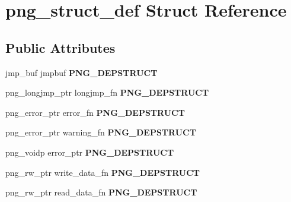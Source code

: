 \hypertarget{structpng__struct__def}{}\section{png\+\_\+struct\+\_\+def Struct Reference}
\label{structpng__struct__def}
\subsection*{Public Attributes}
\begin{DoxyCompactItemize}
\item 
jmp\+\_\+buf jmpbuf {\bfseries P\+N\+G\+\_\+\+D\+E\+P\+S\+T\+R\+U\+CT}\hypertarget{structpng__struct__def_a68dc486a51546dcb141d660fc46d1591}{}\label{structpng__struct__def_a68dc486a51546dcb141d660fc46d1591}

\item 
png\+\_\+longjmp\+\_\+ptr longjmp\+\_\+fn {\bfseries P\+N\+G\+\_\+\+D\+E\+P\+S\+T\+R\+U\+CT}\hypertarget{structpng__struct__def_a1453be90a5d08e8d7397df198eaa9c21}{}\label{structpng__struct__def_a1453be90a5d08e8d7397df198eaa9c21}

\item 
png\+\_\+error\+\_\+ptr error\+\_\+fn {\bfseries P\+N\+G\+\_\+\+D\+E\+P\+S\+T\+R\+U\+CT}\hypertarget{structpng__struct__def_ac29452ea33fb62ad839147c6527b0d76}{}\label{structpng__struct__def_ac29452ea33fb62ad839147c6527b0d76}

\item 
png\+\_\+error\+\_\+ptr warning\+\_\+fn {\bfseries P\+N\+G\+\_\+\+D\+E\+P\+S\+T\+R\+U\+CT}\hypertarget{structpng__struct__def_a4ade3c867ed83447c5a9e1c3c4285063}{}\label{structpng__struct__def_a4ade3c867ed83447c5a9e1c3c4285063}

\item 
png\+\_\+voidp error\+\_\+ptr {\bfseries P\+N\+G\+\_\+\+D\+E\+P\+S\+T\+R\+U\+CT}\hypertarget{structpng__struct__def_a8cd6eb178b9638c129ad79fed4c0c88e}{}\label{structpng__struct__def_a8cd6eb178b9638c129ad79fed4c0c88e}

\item 
png\+\_\+rw\+\_\+ptr write\+\_\+data\+\_\+fn {\bfseries P\+N\+G\+\_\+\+D\+E\+P\+S\+T\+R\+U\+CT}\hypertarget{structpng__struct__def_a5d2681754ffca935ea0656aa55a90d1a}{}\label{structpng__struct__def_a5d2681754ffca935ea0656aa55a90d1a}

\item 
png\+\_\+rw\+\_\+ptr read\+\_\+data\+\_\+fn {\bfseries P\+N\+G\+\_\+\+D\+E\+P\+S\+T\+R\+U\+CT}\hypertarget{structpng__struct__def_a55d91661d6d4474bb7440374798216a1}{}\label{structpng__struct__def_a55d91661d6d4474bb7440374798216a1}


\end{DoxyCompactItemize}
